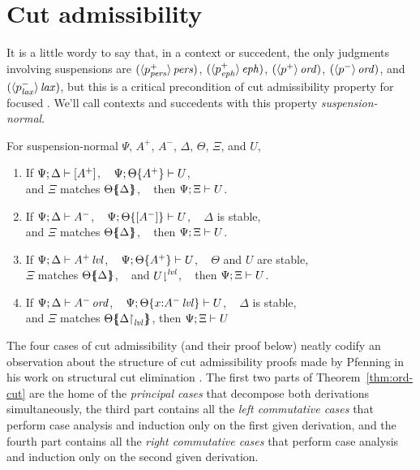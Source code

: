 \section{Cut admissibility}
\label{sec:ord-cut}

It is a little wordy to say that, in a context or succedent, the only
judgments involving suspensions are $({\langle {p^+_{\it pers}} \rangle}\,{{\it pers}})$,
$({\langle {p^+_{\it eph}} \rangle}\,{{\it eph}})$, $({\langle {p^+} \rangle}\,{{\it ord}})$,
$({\langle {p^-} \rangle}\,{{\it ord}})$, and $({\langle {p^-_{\it lax}} \rangle}\,{{\it lax}})$, but this is a
critical precondition of cut admissibility property for focused
\ollll. We'll call contexts and succedents with this property {\it
  suspension-normal}.

\bigskip
\begin{theorem}\label{thm:ord-cut}
For suspension-normal $\Psi$, $A^+$, $A^-$, $\Delta$, $\Theta$, $\Xi$, and $U$,
\begin{enumerate}
\item If ${\Psi};{\Delta} \vdash {[ A^+ ]} \mathstrut$, ~
         ${\Psi};{{\Theta}\{{A^+}\}} \vdash {U} \mathstrut$,\\
      and $\Xi$ matches ${\Theta}\mbox{$\{\hspace{-4pt}\{$}{{\Delta}}\mbox{$\}\hspace{-4pt}\}$}$, ~
      then ${\Psi};{\Xi} \vdash {U} \mathstrut$.
\item If ${\Psi};{\Delta} \vdash {A^-} \mathstrut$, ~
         ${\Psi};{{\Theta}\{{[A^-]}\}} \vdash {U} \mathstrut$, ~
         $\Delta$ is stable, \\
      and $\Xi$ matches ${\Theta}\mbox{$\{\hspace{-4pt}\{$}{\Delta}\mbox{$\}\hspace{-4pt}\}$}$, ~
      then ${\Psi};{\Xi} \vdash {U} \mathstrut$.
\item If ${\Psi};{\Delta} \vdash {{A^+}\,{{\it lvl}}} \mathstrut$, ~
         ${\Psi};{{\Theta}\{{A^+}\}} \vdash {U} \mathstrut$, ~
         $\Theta$ and $U$ are stable, \\ 
      $\Xi$ matches ${\Theta}\mbox{$\{\hspace{-4pt}\{$}{\Delta}\mbox{$\}\hspace{-4pt}\}$}$, ~
      and ${U}{\downharpoonright}^{{\it lvl}}$, ~
      then ${\Psi};{\Xi} \vdash {U} \mathstrut$.
\item If ${\Psi};{\Delta} \vdash {{A^-}\,{{\it ord}}} \mathstrut$, ~
         ${\Psi};{{\Theta}\{{x{:}{A^-}\,{{\it lvl}}}\}} \vdash {U} \mathstrut$, ~
         $\Delta$ is stable, \\ 
      and $\Xi$ matches ${\Theta}\mbox{$\{\hspace{-4pt}\{$}{\ensuremath{{\Delta}{\upharpoonright}_{{\it lvl}}}}\mbox{$\}\hspace{-4pt}\}$}$,
      then ${\Psi};{\Xi} \vdash {U} \mathstrut$
\end{enumerate}
\end{theorem}
\bigskip

\noindent
The four cases of cut admissibility (and their proof below) neatly
codify an observation about the structure of cut admissibility proofs
made by Pfenning in his work on structural cut elimination
\cite{pfenning00structural}.  The first two parts of
Theorem~\ref{thm:ord-cut} are the home of the {\it principal cases}
that decompose both derivations simultaneously, the third part
contains all the {\it left commutative cases} that perform case
analysis and induction only on the first given derivation, and the
fourth part contains all the {\it right commutative cases} that
perform case analysis and induction only on the second given
derivation.

